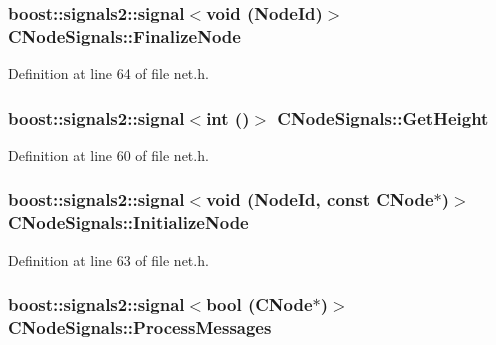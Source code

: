 \subsubsection[{Finalize\+Node}]{\setlength{\rightskip}{0pt plus 5cm}boost\+::signals2\+::signal$<$void ({\bf Node\+Id})$>$ C\+Node\+Signals\+::\+Finalize\+Node}\label{struct_c_node_signals_a4fb2ed0335cbfa8daf5f43a0b42ec481}


Definition at line 64 of file net.\+h.

\hypertarget{struct_c_node_signals_aa9f8b7c213d6c40be77242e8cbcf46e9}{}
\subsubsection[{Get\+Height}]{\setlength{\rightskip}{0pt plus 5cm}boost\+::signals2\+::signal$<$int ()$>$ C\+Node\+Signals\+::\+Get\+Height}\label{struct_c_node_signals_aa9f8b7c213d6c40be77242e8cbcf46e9}


Definition at line 60 of file net.\+h.

\hypertarget{struct_c_node_signals_a137e1854c9fea8a56e5f30be76da8b86}{}
\subsubsection[{Initialize\+Node}]{\setlength{\rightskip}{0pt plus 5cm}boost\+::signals2\+::signal$<$void ({\bf Node\+Id}, const {\bf C\+Node}$\ast$)$>$ C\+Node\+Signals\+::\+Initialize\+Node}\label{struct_c_node_signals_a137e1854c9fea8a56e5f30be76da8b86}


Definition at line 63 of file net.\+h.

\hypertarget{struct_c_node_signals_a9d5d5e496f424ee3331b3dcb0a0c558b}{}
\subsubsection[{Process\+Messages}]{\setlength{\rightskip}{0pt plus 5cm}boost\+::signals2\+::signal$<$bool ({\bf C\+Node}$\ast$)$>$ C\+Node\+Signals\+::\+Process\+Messages}\label{struct_c_node_signals_a9d5d5e496f424ee3331b3dcb0a0c558b}


